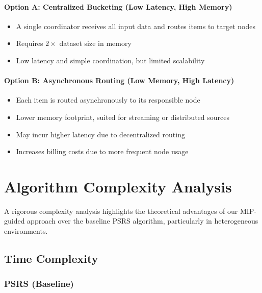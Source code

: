 \documentclass[]{interact}
\theoremstyle{plain}
\theoremstyle{definition}
\theoremstyle{remark}
\begin{document}
\paragraph{Option A: Centralized Bucketing (Low Latency, High Memory)}
\begin{itemize}
    \item A single coordinator receives all input data and routes items to target nodes
    \item Requires $2 \times$ dataset size in memory
    \item Low latency and simple coordination, but limited scalability
\end{itemize}

\paragraph{Option B: Asynchronous Routing (Low Memory, High Latency)}
\begin{itemize}
    \item Each item is routed asynchronously to its responsible node
    \item Lower memory footprint, suited for streaming or distributed sources
    \item May incur higher latency due to decentralized routing
    \item Increases billing costs due to more frequent node usage
\end{itemize}










\section{Algorithm Complexity Analysis}

A rigorous complexity analysis highlights the theoretical advantages of our MIP-guided approach over the baseline PSRS algorithm, particularly in heterogeneous environments.

\subsection{Time Complexity}

\subsubsection{PSRS (Baseline)}
\end{document}
